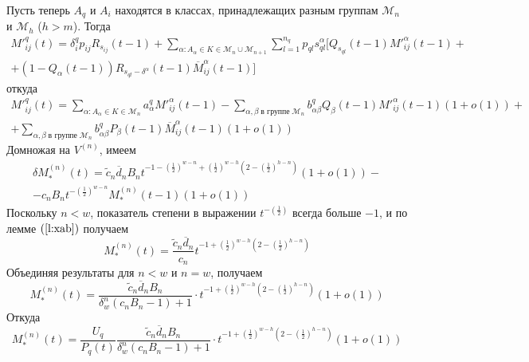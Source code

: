 \documentclass[12pt]{article}
\begin{document}
{Пусть теперь $A_q$ и $A_i$ находятся в классах, принадлежащих разным группам $\mathcal{M}_n$ и $\mathcal{M}_h$ ($h > m$). Тогда
\begin{multline*}
	M'^q_{ij}(t) = \delta^q_i p_{ij} R_{s_{ij}}(t-1) + \sum_{\alpha: A_\alpha \in K \in \mathcal{M}_n \cup \mathcal{M}_{n+1}} \sum_{l=1}^{n_q} p_{ql} s_{ql}^\alpha [Q_{s_{ql}}(t-1) M'^\alpha_{ij}(t-1) + \\
	+ (1 - Q_\alpha(t-1)) R_{s_{ql} - \delta^\alpha}(t-1) \overline{M}^{\alpha}_{ij}(t-1)]
\end{multline*}
откуда
\begin{multline*}
	M'^q_{ij}(t) = \sum_{\alpha : A_\alpha \in K \in \mathcal{M}_n} a^q_\alpha M'^\alpha_{ij}(t-1) - \sum_{\alpha,\beta\; \text{в группе}\; \mathcal{M}_n} b^q_{\alpha \beta} Q_\beta(t-1) M'^\alpha_{ij}(t-1) (1 + o(1)) + \\
	+ \sum_{\alpha,\beta\; \text{в группе}\; \mathcal{M}_n} b^q_{\alpha \beta} P_\beta(t-1) \overline{M}^\alpha_{ij}(t-1) (1 + o(1))
\end{multline*}
Домножая на $V^{(n)}$, имеем
\begin{multline*}
	\delta M^{(n)}_*(t) = \tilde{c}_n \overline{d}_n B_n t^{-1 -\left(\frac{1}{2}\right)^{w-n} + \left(\frac{1}{2}\right)^{w-h} \left(2 - \left(\frac{1}{2}\right)^{h - n}\right)} (1 + o(1)) - \\
	- c_n B_n t^{-\left(\frac{1}{2}\right)^{w-n}} M^{(n)}_*(t-1) (1 + o(1))
\end{multline*}
Поскольку $n < w$, показатель степени в выражении $t^{-\left(\frac{1}{2}\right)}$ всегда больше $-1$, и по лемме $(\ref{l:xab})$ получаем
\begin{equation*}
	M^{(n)}_*(t) = \frac{\tilde{c}_n \overline{d}_n}{c_n} t^{-1 + \left(\frac{1}{2}\right)^{w-h} \left(2 - \left(\frac{1}{2}\right)^{h-n}\right)}
\end{equation*}
Объединяя результаты для $n < w$ и $n = w$, получаем
\begin{equation*}
	M^{(n)}_*(t) = \frac{\tilde{c}_n \overline{d}_n B_n}{\delta^n_w (c_n B_n - 1) + 1} \cdot t^{-1 + \left(\frac{1}{2}\right)^{w-h} \left(2 - \left(\frac{1}{2}\right)^{h-n} \right)} (1 + o(1))
\end{equation*}
Откуда
\begin{equation*}
	M^{(n)}_*(t) = \frac{U_q}{P_q(t)} \frac{\tilde{c}_n \overline{d}_n B_n}{\delta^n_w (c_n B_n - 1) + 1} \cdot t^{-1 + \left(\frac{1}{2}\right)^{w-h} \left(2 - \left(\frac{1}{2}\right)^{h-n} \right)} (1 + o(1))
\end{equation*}

}
\end{document}
